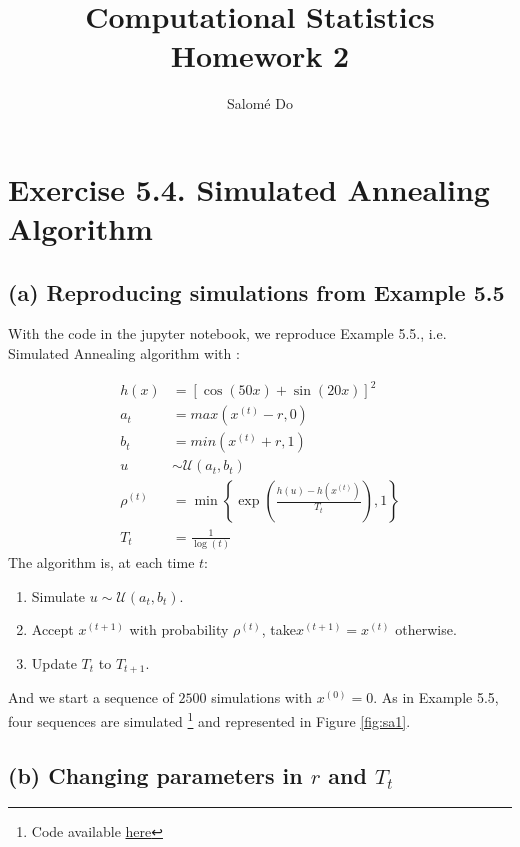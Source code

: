 \documentclass{article}
\begin{document}
    
\thispagestyle{empty}

\title{Computational Statistics\\ Homework 2 }
\author{Salomé Do}
\maketitle

\section*{Exercise 5.4. Simulated Annealing Algorithm}

\subsection*{(a) Reproducing simulations from Example 5.5}


With the code in the jupyter notebook, we reproduce Example 5.5., i.e.
Simulated Annealing algorithm with :

\begin{align*}
    h(x) &= [\cos(50x) + \sin(20x)]^2 \\
    a_t &= max(x^{(t)}-r, 0) \\
    b_t &= min(x^{(t)}+r, 1) \\
    u &\sim \mathcal{U}(a_t, b_t) \\
    \rho^{(t)} &= \min \left \{  \exp\left ( \frac{h(u)-h(x^{(t)})}{T_t}\right ), 1    \right \} \\
    T_t &= \frac{1}{\log(t)}
\end{align*}
The algorithm is, at each time $t$: 
\begin{enumerate}
    \item Simulate $u \sim \mathcal{U}(a_t, b_t)$. 
    \item Accept $x^{(t+1)}$ with probability $\rho^{(t)}$, take$x^{(t+1)} =x^{(t)}$ otherwise.
    \item Update $T_t$ to $T_{t+1}$.
\end{enumerate}

\noindent And we start a sequence of $2500$ simulations with $x^{(0)}= 0$. 
As in Example 5.5, four sequences are simulated \footnote{Code available  \href{https://github.com/sally14/ComputationalStats/blob/master/TD2/Simulated_Annealing.ipynb}{here}}
and represented in Figure \ref{fig:sa1}.
  
\subsection*{(b) Changing parameters in $r$ and $T_t$}
\end{document}
